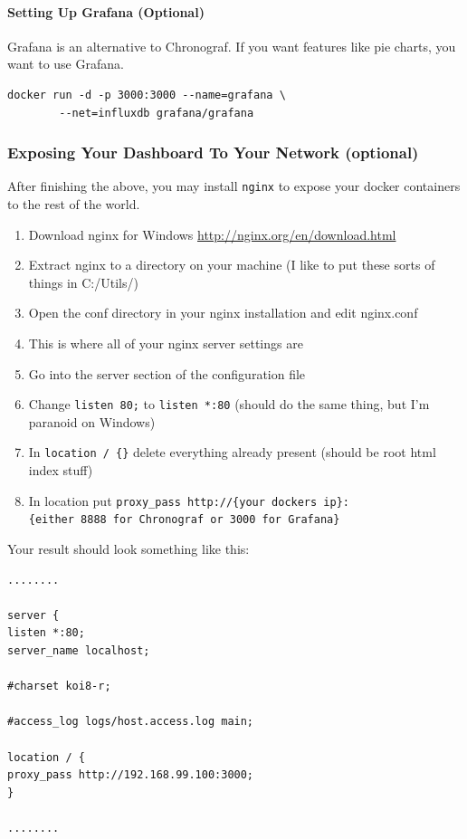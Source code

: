 \paragraph{Setting Up Grafana
(Optional)}\label{setting-up-grafana-optional}

Grafana is an alternative to Chronograf. If you want features like pie
charts, you want to use Grafana.

\begin{verbatim}
docker run -d -p 3000:3000 --name=grafana \
        --net=influxdb grafana/grafana
\end{verbatim}

\subsubsection{Exposing Your Dashboard To Your Network
(optional)}\label{exposing-your-dashboard-to-your-network-optional}

After finishing the above, you may install \texttt{nginx} to expose your
docker containers to the rest of the world.

\begin{enumerate}
\def\labelenumi{\arabic{enumi}.}
\tightlist
\item
  Download nginx for Windows \url{http://nginx.org/en/download.html}
\item
  Extract nginx to a directory on your machine (I like to put these
  sorts of things in C:/Utils/)
\item
  Open the conf directory in your nginx installation and edit nginx.conf
\item
  This is where all of your nginx server settings are
\item
  Go into the server section of the configuration file
\item
  Change \texttt{listen\ 80;} to \texttt{listen\ *:80} (should do the
  same thing, but I'm paranoid on Windows)
\item
  In \texttt{location\ /\ \{\}} delete everything already present
  (should be root html index stuff)
\item
  In location put
  \texttt{proxy\_pass\ http://\{your\ docker\textquotesingle{}s\ ip\}:\{either\ 8888\ for\ Chronograf\ or\ 3000\ for\ Grafana\}}
\end{enumerate}

Your result should look something like this:

\begin{verbatim}
........

server {
listen *:80;
server_name localhost;

#charset koi8-r;

#access_log logs/host.access.log main;

location / {
proxy_pass http://192.168.99.100:3000;
}

........
\end{verbatim}

